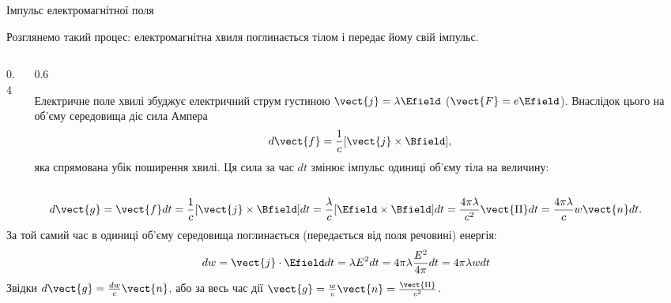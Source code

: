 \documentclass[onlytextwidth]{beamer}
\begin{document}
\begin{frame}{Імпульс електромагнітної поля}{}
	\begin{block}{}
		Розглянемо такий процес: електромагнітна хвиля поглинається тілом і передає йому свій імпульс.
	\end{block}
	\begin{columns}
		\begin{column}{0.4\linewidth}\centering
			
		\end{column}
		\begin{column}{0.6\linewidth}
			\begin{block}{}\justifying\small
				Електричне поле хвилі збуджує електричний струм густиною $ \vect{j} = \lambda\Efield $ ($ \vect{F} = e\Efield $). Внаслідок цього на
				об'єму середовища діє сила Ампера
				\begin{equation*}
					d\vect{f} = \frac1c[\vect{j}\times\Bfield],
				\end{equation*}
				яка спрямована убік поширення хвилі. Ця сила за час $dt$ змінює імпульс одиниці об'єму тіла на величину:

			\end{block}
		\end{column}
	\end{columns}
	\begin{block}{}\justifying
		\begin{equation*}
			d\vect{g} = \vect{f} dt =  \frac1c[\vect{j}\times\Bfield] dt = \frac{\lambda}{c}[\Efield \times\Bfield]dt =
			\frac{4\pi\lambda}{c^2}\vect{\Pi}dt
			=
			\frac{4\pi\lambda}{c} w \vect{n} dt.
		\end{equation*}
		За той самий час в одиниці об'єму середовища поглинається (передається від поля речовині) енергія:
		\begin{equation*}
			dw = \vect{j}\cdot\Efield dt = \lambda E^2dt = 4\pi\lambda \frac{E^2}{4\pi} dt = 4\pi\lambda w dt
		\end{equation*}
		Звідки $d\vect{g} = \frac{dw}c \vect{n}$, або за весь час дії $\vect{g} = \frac{w}{c} \vect{n} = \frac{\vect{\Pi}}{c^2}$.
	\end{block}
\end{frame}
\end{document}
